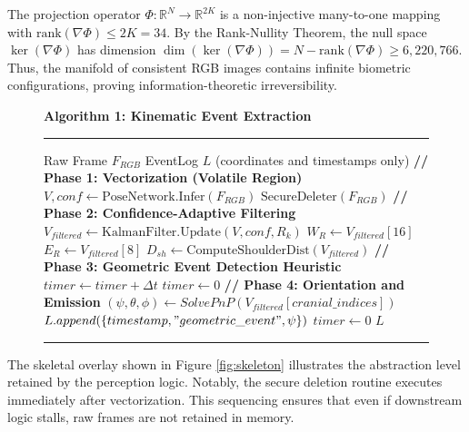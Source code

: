 \documentclass[conference]{IEEEtran}
\begin{document}
\begin{IEEEproof}
The projection operator $\Phi: \mathbb{R}^N \to \mathbb{R}^{2K}$ is a non-injective many-to-one mapping with $\mathrm{rank}(\nabla \Phi) \le 2K = 34$. By the Rank-Nullity Theorem, the null space $\ker(\nabla \Phi)$ has dimension $\dim(\ker(\nabla \Phi)) = N - \mathrm{rank}(\nabla \Phi) \ge 6,220,766$. Thus, the manifold of consistent RGB images contains infinite biometric configurations, proving information-theoretic irreversibility.
\end{IEEEproof}

\begin{figure}[htbp]
\centering
\vspace{0.2cm}
\textbf{Algorithm 1: Kinematic Event Extraction}
\hrule
\vspace{0.1cm}
\begin{algorithmic}[1]
\small
\Require Raw Frame $F_{RGB}$
\Ensure EventLog $L$ (coordinates and timestamps only)
\State \textbf{// Phase 1: Vectorization (Volatile Region)}
\State $V, conf \leftarrow \text{PoseNetwork.Infer}(F_{RGB})$
\State $\text{SecureDeleter}(F_{RGB})$ 
\State
\State \textbf{// Phase 2: Confidence-Adaptive Filtering}
\State $V_{filtered} \leftarrow \text{KalmanFilter.Update}(V, conf, R_k)$
\State $W_R \leftarrow V_{filtered}[16]$ 
\State $E_R \leftarrow V_{filtered}[8]$  
\State $D_{sh} \leftarrow \text{ComputeShoulderDist}(V_{filtered})$
\State
\State \textbf{// Phase 3: Geometric Event Detection Heuristic}
    \State $timer \leftarrow timer + \Delta t$
\Else
    \State $timer \leftarrow 0$
\EndIf
\State
\State \textbf{// Phase 4: Orientation and Emission}
\State $(\psi, \theta, \phi) \leftarrow SolvePnP(V_{filtered}[cranial\_indices])$
    \State $L.append(\{ timestamp, "geometric\_event", \psi \})$
    \State $timer \leftarrow 0$
\EndIf
\State \Return $L$ 
\end{algorithmic}
\hrule
\label{alg:pose}
\end{figure}

The skeletal overlay shown in Figure \ref{fig:skeleton} illustrates the abstraction level retained by the perception logic. 
Notably, the secure deletion routine executes immediately after vectorization. This sequencing ensures that even if downstream logic stalls, raw frames are not retained in memory.
\end{document}
